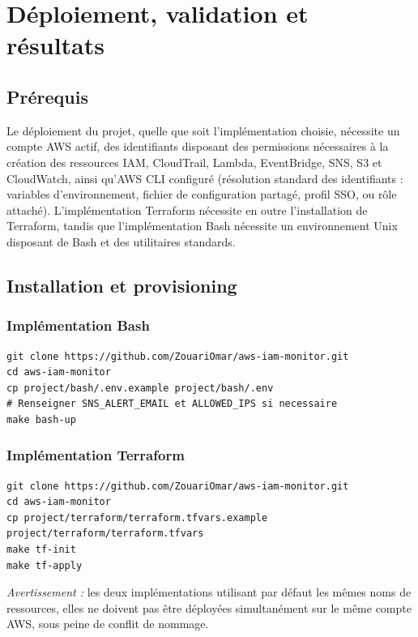 \documentclass[11pt,a4paper]{report}
\begin{document}
\chapter{Déploiement, validation et résultats}

\section{Prérequis}

Le déploiement du projet, quelle que soit l'implémentation choisie, nécessite un compte AWS actif, des identifiants disposant des permissions nécessaires à la création des ressources IAM, CloudTrail, Lambda, EventBridge, SNS, S3 et CloudWatch, ainsi qu'AWS CLI configuré (résolution standard des identifiants : variables d'environnement, fichier de configuration partagé, profil SSO, ou rôle attaché). L'implémentation Terraform nécessite en outre l'installation de Terraform, tandis que l'implémentation Bash nécessite un environnement Unix disposant de Bash et des utilitaires standards.

\section{Installation et provisioning}

\subsection{Implémentation Bash}
\begin{lstlisting}
git clone https://github.com/ZouariOmar/aws-iam-monitor.git
cd aws-iam-monitor
cp project/bash/.env.example project/bash/.env
# Renseigner SNS_ALERT_EMAIL et ALLOWED_IPS si necessaire
make bash-up
\end{lstlisting}

\subsection{Implémentation Terraform}
\begin{lstlisting}
git clone https://github.com/ZouariOmar/aws-iam-monitor.git
cd aws-iam-monitor
cp project/terraform/terraform.tfvars.example project/terraform/terraform.tfvars
make tf-init
make tf-apply
\end{lstlisting}

\textit{Avertissement :} les deux implémentations utilisant par défaut les mêmes noms de ressources, elles ne doivent pas être déployées simultanément sur le même compte AWS, sous peine de conflit de nommage.
\end{document}

